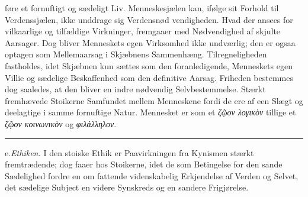 \documentclass[12pt,a4paper]{book}
\newcommand{\divrule}{\begin{center}\rule{2cm}{0.4pt}\end{center}}
\newcommand{\gk}[1]{\textit{#1}}
\begin{document}
føre et fornuftigt og sædeligt Liv. Menneskesjælen kan, ifølge
sit Forhold til Verdenssjælen, ikke unddrage sig Verdensnød\-%
vendigheden. Hvad der ansees for vilkaarlige og tilfældige
Virkninger, fremgaaer med Nødvendighed af skjulte Aarsager.
Dog bliver Menneskets egen Virksomhed ikke undværlig; den
er ogsaa optagen som Mellemaarsag i Skjæbnens Sammenhæng.
Tilregneligheden fastholdes, idet Skjæbnen kun sættes som den
foranledigende, Menneskets egen Villie og sædelige Beskaffenhed
som den definitive Aarsag. Friheden bestemmes dog saaledes,
at den bliver en indre nødvendig Selvbestemmelse. Stærkt
fremhævede Stoikerne Samfundet mellem Menneskene fordi de
ere af een Slægt og deelagtige i samme fornuftige Natur.
Mennesket er som et \gk{ζῷον λογικὸν} tillige et \gk{ζῷον κοινωνικὸν}
og \gk{φιλάλληλον}.
\divrule

e.\enspace \emph{Ethiken.} I den stoiske Ethik er Paavirkningen fra
Kynismen stærkt fremtrædende; dog faaer hos Stoikerne, idet
de som Betingelse for den sande Sædelighed fordre en om\-%
fattende videnskabelig Erkjendelse af Verden og Selvet, det
sædelige Subject en videre Synskreds og en sandere Frigjørelse.
\end{document}
